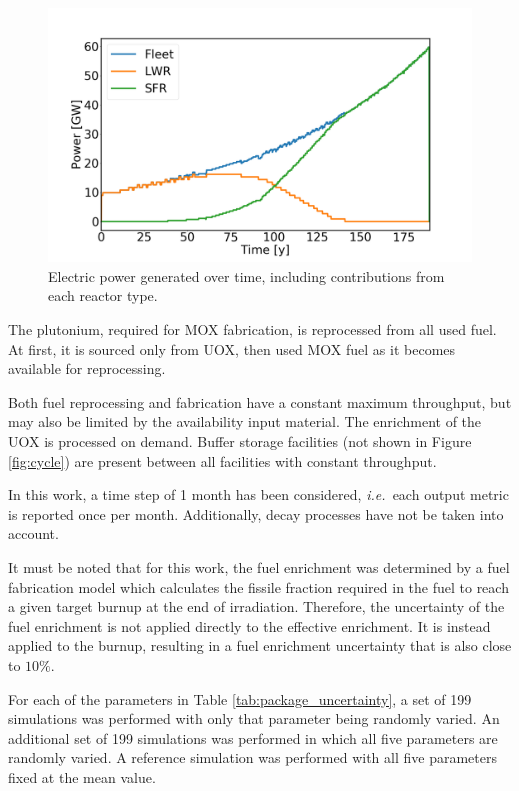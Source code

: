 \documentclass{anstrans}
\newcommand{\ie}{\emph{i.e.\ }}
\begin{document}
\begin{figure}[t] %
    \centering
    \includegraphics[scale=0.18]{power.png}
    \caption{Electric power generated over time, including contributions from each reactor type.}
    \label{fig:power}
\end{figure}


The plutonium, required for \gls{MOX} fabrication, is reprocessed from all
used fuel.  At first, it is sourced only from \gls{UOX}, then used \gls{MOX} fuel
as it becomes available for reprocessing.

Both fuel reprocessing and fabrication have a constant maximum throughput, but may also be limited by the 
availability input material.  The enrichment of the \gls{UOX} is processed
on demand.  Buffer storage facilities (not shown in Figure \ref{fig:cycle}) are present
between all facilities with constant throughput.

In this work, a time step of 1 month has been considered, \ie each output
metric is reported once per month. Additionally, decay processes have not be
taken into account.  

It must be noted that for this work, the fuel enrichment was determined by a
fuel fabrication model\cite{Leniau2015125} which
calculates the fissile fraction required in the fuel to reach a given target
burnup at the end of irradiation.  Therefore, the uncertainty of the fuel
enrichment is not applied directly to the effective enrichment. It is instead applied to the
burnup, resulting in a fuel enrichment uncertainty that is also close to
$10\%$.

For each of the parameters in Table \ref{tab:package_uncertainty}, a set of
199 simulations was performed with only that parameter being randomly varied.
An additional set of 199 simulations was performed in which all five
parameters are randomly varied.  A reference simulation was performed
with all five parameters fixed at the mean value.
\end{document}
